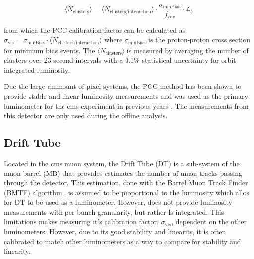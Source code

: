 \begin{equation}
	\label{eq:pcc-clusters-mean}
	\langle N_{\text{clusters}} \rangle = \langle N_{\text{clusters} / \text{interaction}} \rangle \cdot \frac{\sigma_{\text{minBias}}}{f_{rev}} \cdot \mathcal{L}_b
\end{equation}

from which the PCC calibration factor can be calculated as $\sigma_{\text{vis}} = \sigma_{\text{minBias}} \cdot \langle N_{\text{clusters} / \text{interaction}} \rangle$ where $\sigma_{\text{minBias}}$ is the proton-proton cross section for minimum bias events. The $\langle N_{\text{clusters}} \rangle$ is measured by averaging the number of clusters over 23 second intervals with a 0.1\% statistical uncertainty for orbit integrated luminosity.

Due the large ammount of pixel systems, the PCC method has been shown to provide stable and linear luminosity measurements and was used as the primary luminometer for the \acrshort{cms} experiment in previous years \cite{Sirunyan:2759951}. The measurements from this detector are only used during the offline analysis. 

\subsection{Drift Tube}
\label{subsec:dt}

Located in the \acrshort{cms} muon system, the Drift Tube (DT) is a sub-system of the muon barrel (MB) that provides estimates the number of muon tracks passing through the detector. This estimation, done with the Barrel Muon Track Finder (BMTF) algorithm \cite{Triossi_2017}, is assumed to be proportional to the luminosity which allos for DT to be used as a luminometer. However, does not provide luminosity measurements with per bunch granularity, but rather \acrshort{ls}-integrated. This limitations makes measuring it's calibration factor, $\sigma_{\text{vis}}$, dependent on the other luminometers. However, due to its good stability and linearity, it is often calibrated to match other luminometers as a way to compare for stability and linearity.

